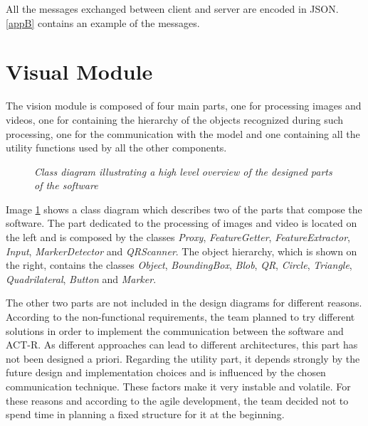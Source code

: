 	All the messages exchanged between client and server are encoded in \mbox{JSON}. 
	\ref{appB} contains an example of the messages.


	\section{Visual Module}
	The vision module is composed of four main parts, one for processing images and videos, one for containing the hierarchy of the objects recognized during such processing, one for the communication with the model and one containing all the utility functions used by all the other components.
	
	\begin{figure}[h]
	  \begin{center} 
	  \end{center} 
	  \caption{\textit{Class diagram illustrating a high level overview of the designed parts of the software}}  
	  \label{fig:classOverview}
 	\end{figure}

	Image \ref{fig:classOverview} shows a class diagram which describes two of the parts that compose the software. 
	The part dedicated to the processing of images and video is located on the left and is composed by the classes \emph{Proxy}, \emph{FeatureGetter}, \emph{FeatureExtractor}, \emph{Input}, \emph{MarkerDetector} and \emph{QRScanner}.
	The object hierarchy, which is shown on the right, contains the classes \emph{Object}, \emph{BoundingBox}, \emph{Blob}, \emph{QR}, \emph{Circle}, \emph{Triangle}, \emph{Quadrilateral}, \emph{Button} and \emph{Marker}.

	The other two parts are not included in the design diagrams for different reasons. 
	According to the non-functional requirements, the team planned to try different solutions in order to implement the communication between the software and ACT-R. As different approaches can lead to different architectures, this part has not been designed a priori.
	Regarding the utility part, it depends strongly by the future design and implementation choices and is influenced by the chosen communication technique. These factors make it very instable and volatile. 
	For these reasons and according to the agile development, the team decided not to spend time in planning a fixed structure for it at the beginning.

	
